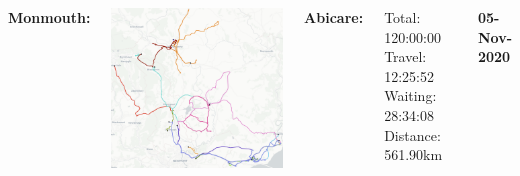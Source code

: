 \documentclass[usenames,dvipsnames]{beamer}
\begin{document}

\begin{frame} %
	\begin{columns}
		\begin{minipage}[c][0.05\textheight][c]{\linewidth}
			\hspace{35mm}
			\textbf{Monmouth:}
		\end{minipage}
		\begin{minipage}[c][0.65\textheight][c]{\linewidth}
			\centering
			\includegraphics[width=1\linewidth]{figures/05MonmouthAbi}
		\end{minipage}
		\begin{minipage}[c][0.2\textheight][c]{\linewidth}
			\scriptsize
			\hspace{17mm}\textbf{Abicare:}
			\begin{itemize}
				\setlength{\itemindent}{0.5in}
				\aitem Total: 120:00:00
				\aitem Travel: 12:25:52
				\aitem Waiting: 28:34:08
				\aitem Distance: 561.90km
			\end{itemize}
		\end{minipage}
		\begin{minipage}[c][0.05\textheight][c]{\linewidth}
			\textbf{05-Nov-2020}
		\end{minipage}

\end{columns}
\end{frame}
\end{document}
